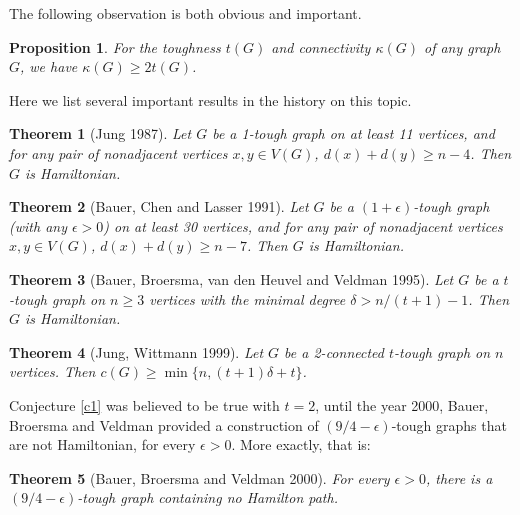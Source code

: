 \documentclass[12pt]{report}
\newtheorem{theorem}{Theorem}
\newtheorem{proposition}{Proposition}
\begin{document}
The following observation is both obvious and important.
\begin{proposition}\label{prokg2t}
For the toughness $t(G)$ and connectivity $\kappa(G)$ of any graph $G$, we have $\kappa(G)\ge2t(G)$.
\end{proposition}





Here we list several important results in the history on this topic.
\begin{theorem}[Jung 1987]
Let $G$ be a 1-tough graph on at least 11 vertices, and for any pair of nonadjacent vertices $x,y\in V(G)$, $d(x)+d(y)\ge n-4$. Then $G$ is Hamiltonian.
\end{theorem}


\begin{theorem}[Bauer, Chen and Lasser 1991]
Let $G$ be a $(1+\epsilon)$-tough graph (with any $\epsilon>0$) on at least 30 vertices, and for any pair of nonadjacent vertices $x,y\in V(G)$, $d(x)+d(y)\ge n-7$. Then $G$ is Hamiltonian.
\end{theorem}

\begin{theorem}[Bauer, Broersma, van den Heuvel and Veldman 1995]
Let $G$ be a $t$-tough graph on $n\ge3$ vertices with the minimal degree $\delta>n/(t+1)-1$. Then $G$ is Hamiltonian.
\end{theorem}

\begin{theorem}[Jung, Wittmann 1999]
Let $G$ be a 2-connected $t$-tough graph on $n$ vertices. Then $c(G)\ge\min\{n,(t+1)\delta+t\}$.
\end{theorem}

Conjecture \ref{c1} was believed to be true with $t=2$, until the year 2000, Bauer, Broersma and Veldman \cite{bauer2000not} provided a construction of $(9/4-\epsilon)$-tough graphs that are not Hamiltonian, for every $\epsilon>0$. More exactly, that is:
\begin{theorem}[Bauer, Broersma and Veldman 2000]\label{exa2000nh}
For every $\epsilon>0$, there is a $(9/4-\epsilon)$-tough  graph containing no Hamilton path.
\end{theorem}
\end{document}
